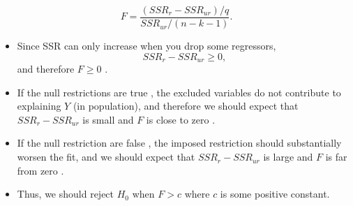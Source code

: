 \documentclass[notes=show,compress,beamer]{beamer}
\begin{document}
\begin{frame}%

%
\begin{equation*}
F=\frac{\left( SSR_{r}-SSR_{ur}\right) /q}{SSR_{ur}/\left( n-k-1\right) }.
\end{equation*}%
\pause%

\begin{itemize}
\item Since SSR can only increase when you drop some regressors,%
\begin{equation*}
SSR_{r}-SSR_{ur}\geq 0,
\end{equation*}%
and therefore 
\color{blue}%
$F\geq 0$%
\color{black}%
.%
\pause%

\item If the null restrictions are 
\color{blue}%
true%
\color{black}%
, the excluded variables do not contribute to explaining $Y$ (in
population), and therefore we should expect that $SSR_{r}-SSR_{ur}$ is small
and 
\color{blue}%
$F$ is close to zero%
\color{black}%
.%
\pause%

\item If the null restriction are 
\color{red}%
false%
\color{black}%
, the imposed restriction should substantially worsen the fit, and we should
expect that $SSR_{r}-SSR_{ur}$ is large and 
\color{red}%
$F$ is far from zero%
\color{black}%
.%
\pause%

\item Thus, we should reject $H_{0}$ when $F>c$ where $c$ is some positive
constant.
\end{itemize}

\end{frame}%
\end{document}
